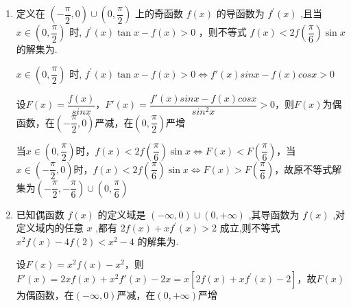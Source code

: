 \begin{enumerate}
\begin{enumerate}
        \begin{jieda}
            设$F(x) = \dfrac{f(x)}{cosx}$，则$F(x)$为偶函数
            
            $F'(x) = \dfrac{f'(x)cosx+f(x)sinx}{cos^2x}$，故$F(x)$在$0 < x < \dfrac{\pi }{2}$严格减

            $f\left( x\right)  < {2f}\left( \dfrac{\pi }{3}\right) \cos x \Longleftrightarrow F(x) < F\left(\dfrac{\pi}{3}\right)$，故根据$F(x)$性质可知解集为$\left( {-\dfrac{\pi }{2}, - \dfrac{\pi }{3}}\right)  \cup  \left( {\dfrac{\pi }{3},\dfrac{\pi }{2}}\right)$
        \end{jieda}

        \item 定义在 $\left( {-\dfrac{\pi }{2},0}\right)  \cup  \left( {0,\dfrac{\pi }{2}}\right)$ 上的奇函数 $f\left( x\right)$ 的导函数为 ${f}^{\prime }\left( x\right)$ ,且当 $x \in  \left( {0,\dfrac{\pi }{2}}\right)$ 时, ${f}^{\prime }\left( x\right) \tan x - f\left( x\right)  > 0$ ，则不等式 $f\left( x\right)  < {2f}\left( \dfrac{\pi }{6}\right) \sin x$ 的解集为.
        \begin{jieda}
            $x \in  \left( {0,\dfrac{\pi }{2}}\right)$ 时, ${f}^{\prime }\left( x\right) \tan x - f\left( x\right)  > 0 \Longleftrightarrow f'(x)sinx-f(x)cosx > 0$

            设$F(x) = \dfrac{f(x)}{sinx}$，$F'(x) = \dfrac{f'(x)sinx-f(x)cosx}{sin^2x} > 0$，则$F(x)$为偶函数，在$\left( {-\dfrac{\pi }{2},0}\right)$严减，在$\left( {0,\dfrac{\pi }{2}}\right)$严增

            当$x \in \left(0, \dfrac{\pi}{2}\right)$时，$f\left( x\right)  < {2f}\left( \dfrac{\pi }{6}\right) \sin x \Longleftrightarrow F(x) < F\left(\dfrac{\pi}{6}\right)$，当$x \in \left(-\dfrac{\pi}{2}, 0\right)$时，$f\left( x\right)  < {2f}\left( \dfrac{\pi }{6}\right) \sin x \Longleftrightarrow F(x) > F\left(\dfrac{\pi}{6}\right)$，故原不等式解集为$\left( {-\dfrac{\pi }{2}, - \dfrac{\pi }{6}}\right)  \cup  \left( {0,\dfrac{\pi }{6}}\right)$
        \end{jieda}

        \item 已知偶函数 $f\left( x\right)$ 的定义域是 $\left( {-\infty ,0}\right)  \cup  \left( {0, + \infty }\right)$ ,其导函数为 $f\left( x\right)$ ,对定义域内的任意 $x$ ,都有 ${2f}\left( x\right)  + x{f}^{\prime }\left( x\right)  > 2$ 成立,则不等式 ${x}^{2}f\left( x\right)  - {4f}\left( 2\right)  < {x}^{2} - 4$ 的解集为.
        \begin{jieda}
            设$F(x) = x^2f(x)-x^2$，则$F'(x) = 2xf(x)+x^2f'(x)-2x = x[{2f}\left( x\right)  + x{f}^{\prime }\left( x\right)-2]$，故$F(x)$为偶函数，在$(-\infty, 0)$严减，在$(0, +\infty)$严增


\end{jieda}
\end{enumerate}
\end{enumerate}
